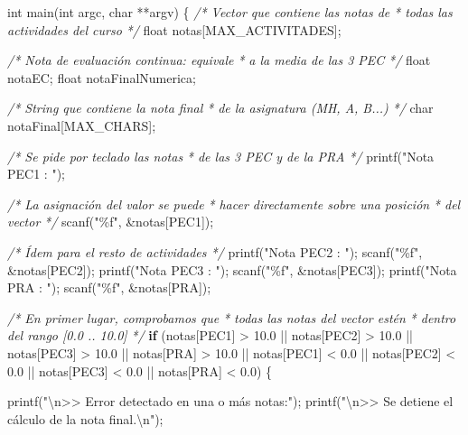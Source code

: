\documentclass[
]{book}
\newenvironment{Shaded}{\begin{snugshade}}{\end{snugshade}}
\newcommand{\CommentTok}[1]{\textcolor[rgb]{0.56,0.35,0.01}{\textit{#1}}}
\newcommand{\ControlFlowTok}[1]{\textcolor[rgb]{0.13,0.29,0.53}{\textbf{#1}}}
\newcommand{\DataTypeTok}[1]{\textcolor[rgb]{0.13,0.29,0.53}{#1}}
\newcommand{\FloatTok}[1]{\textcolor[rgb]{0.00,0.00,0.81}{#1}}
\newcommand{\NormalTok}[1]{#1}
\newcommand{\SpecialCharTok}[1]{\textcolor[rgb]{0.00,0.00,0.00}{#1}}
\newcommand{\StringTok}[1]{\textcolor[rgb]{0.31,0.60,0.02}{#1}}
\begin{document}
\begin{Shaded}
\begin{Highlighting}[]
\DataTypeTok{int}\NormalTok{ main(}\DataTypeTok{int}\NormalTok{ argc, }\DataTypeTok{char}\NormalTok{ **argv) \{}
    \CommentTok{/* Vector que contiene las notas de}
\CommentTok{     * todas las actividades del curso}
\CommentTok{     */}
    \DataTypeTok{float}\NormalTok{ notas[MAX\_ACTIVITADES]; }

    \CommentTok{/* Nota de evaluación continua: equivale}
\CommentTok{     * a la media de las 3 PEC }
\CommentTok{     */}
    \DataTypeTok{float}\NormalTok{ notaEC;}
    \DataTypeTok{float}\NormalTok{ notaFinalNumerica;}

    \CommentTok{/* String que contiene la nota final }
\CommentTok{     * de la asignatura (MH, A, B...) }
\CommentTok{     */}
    \DataTypeTok{char}\NormalTok{ notaFinal[MAX\_CHARS];}

    \CommentTok{/* Se pide por teclado las notas}
\CommentTok{     * de las 3 PEC y de la PRA}
\CommentTok{     */}
\NormalTok{    printf(}\StringTok{"Nota PEC1 : "}\NormalTok{);}

    \CommentTok{/* La asignación del valor se puede}
\CommentTok{     * hacer directamente sobre una posición}
\CommentTok{     * del vector}
\CommentTok{     */}
\NormalTok{    scanf(}\StringTok{"\%f"}\NormalTok{, \&notas[PEC1]);}

    \CommentTok{/* Ídem para el resto de actividades */}
\NormalTok{    printf(}\StringTok{"Nota PEC2 : "}\NormalTok{);}
\NormalTok{    scanf(}\StringTok{"\%f"}\NormalTok{, \&notas[PEC2]);}
\NormalTok{    printf(}\StringTok{"Nota PEC3 : "}\NormalTok{);}
\NormalTok{    scanf(}\StringTok{"\%f"}\NormalTok{, \&notas[PEC3]);}
\NormalTok{    printf(}\StringTok{"Nota PRA : "}\NormalTok{);}
\NormalTok{    scanf(}\StringTok{"\%f"}\NormalTok{, \&notas[PRA]);}

    \CommentTok{/* En primer lugar, comprobamos que}
\CommentTok{     * todas las notas del vector estén}
\CommentTok{     * dentro del rango [0.0 .. 10.0]}
\CommentTok{     */}
    \ControlFlowTok{if}\NormalTok{ (notas[PEC1] \textgreater{} }\FloatTok{10.0}\NormalTok{ || notas[PEC2] \textgreater{} }\FloatTok{10.0}\NormalTok{ ||}
\NormalTok{        notas[PEC3] \textgreater{} }\FloatTok{10.0}\NormalTok{ || notas[PRA] \textgreater{} }\FloatTok{10.0}\NormalTok{ ||}
\NormalTok{        notas[PEC1] \textless{} }\FloatTok{0.0}\NormalTok{ || notas[PEC2] \textless{} }\FloatTok{0.0}\NormalTok{ ||}
\NormalTok{        notas[PEC3] \textless{} }\FloatTok{0.0}\NormalTok{ || notas[PRA] \textless{} }\FloatTok{0.0}\NormalTok{) \{}

\NormalTok{        printf(}\StringTok{"}\SpecialCharTok{\textbackslash{}n}\StringTok{\textgreater{}\textgreater{} Error detectado en una o más notas:"}\NormalTok{);}
\NormalTok{        printf(}\StringTok{"}\SpecialCharTok{\textbackslash{}n}\StringTok{\textgreater{}\textgreater{} Se detiene el cálculo de la nota final.}\SpecialCharTok{\textbackslash{}n}\StringTok{"}\NormalTok{);}


\end{Highlighting}
\end{Shaded}
\end{document}
